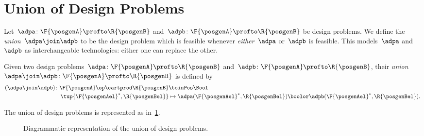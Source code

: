 
\section{Union of Design Problems}


Let~$\adpa\colon \F{\posgenA}\profto \R{\posgenB}$ and~$\adpb\colon \F{\posgenA}\profto \R{\posgenB}$ be design problems.
We define the \emph{union}~$\adpa \join \adpb$ to be the design problem which is feasible whenever \emph{either}~$\adpa$ or~$\adpb$ is feasible.
This models~$\adpa$ and~$\adpb$ as interchangeable technologies: either one can replace the other.

\begin{definition}
    \label{def:union_dp}
    Given two design problems~$\adpa \colon \F{\posgenA} \profto \R{\posgenB}$ and~$\adpb\colon \F{\posgenA} \profto \R{\posgenB}$, their \emph{union}~$\adpa \join \adpb\colon \F{\posgenA} \profto \R{\posgenB}$ is defined by
    \begin{equation}
        \begin{aligned}
            (\adpa \join \adpb)
            \colon \F{\posgenA}\op \cartprod \R{\posgenB} & \toinPos \Bool                                                                                   \\
            \tup{\F{\posgenAel}^*, \R{\posgenBel}}        & \mapsto \adpa(\F{\posgenAel}^*, \R{\posgenBel}) \boolor \adpb(\F{\posgenAel}^*, \R{\posgenBel}).
        \end{aligned}
    \end{equation}
\end{definition}

The union of design problems is represented as in~\cref{fig:uniondp}.

\begin{figure}[h!]
    \centering
    \caption{Diagrammatic representation of the union of design problems. }
    \label{fig:uniondp}
\end{figure}

